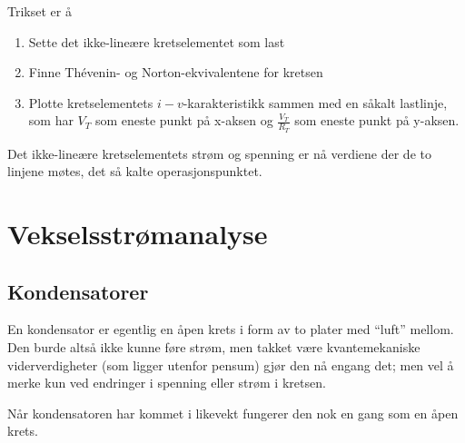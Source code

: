 \documentclass[norsk, a4paper, 12pt, twoside, titlepage]{article}
\begin{document}
Trikset er å 
\begin{enumerate}
\item Sette det ikke-lineære kretselementet som last
\item Finne Thévenin- og Norton-ekvivalentene for kretsen
\item Plotte kretselementets $i-v$-karakteristikk sammen med en såkalt
  lastlinje, som har $V_{T}$ som eneste punkt på x-aksen og
  $\frac{V_{T}}{R_{T}}$ som eneste punkt på y-aksen.
\end{enumerate}

Det ikke-lineære kretselementets strøm og spenning er nå verdiene der
de to linjene møtes, det så kalte operasjonspunktet.


\section{Vekselsstrømanalyse}

\subsection{Kondensatorer}
En kondensator er egentlig en åpen krets i form av to plater med
``luft'' mellom.  Den burde altså ikke kunne føre strøm, men takket
være kvantemekaniske viderverdigheter (som ligger utenfor pensum) gjør
den nå engang det; men vel å merke kun ved endringer i spenning eller
strøm i kretsen.

Når kondensatoren har kommet i likevekt fungerer den nok en gang som
en åpen krets.  


\newpage
\printindex
\end{document}
